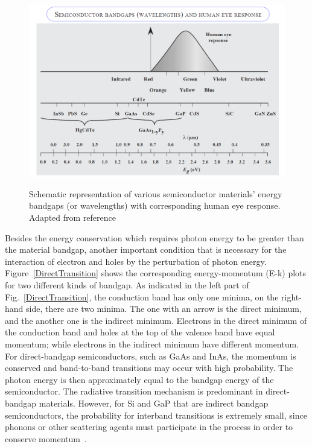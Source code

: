 \begin{figure}
  \caption[Schematic representation of various semiconductor materials' energy bandgaps (or wavelengths) with corresponding human eye response.]{Schematic representation of various semiconductor materials' energy bandgaps (or wavelengths) with corresponding human eye response. Adapted from reference~\cite{singh2007semiconductor}}
  \centering
  \includegraphics[width=\textwidth]{pictures/RM/BandgapEmission}
  \label{BandgapEmission}
\end{figure}

Besides the energy conservation which requires photon energy to be greater than
the material bandgap, another important condition that is necessary for the
interaction of electron and holes by the perturbation of photon energy.
Figure~\ref{DirectTransition} shows the corresponding energy-momentum (E-k)
plots for two different kinds of bandgap. As indicated in the left part of
Fig.~\ref{DirectTransition}, the conduction band has only one minima, on the
right-hand side, there are two minima. The one with an arrow is the direct
minimum, and the another one is the indirect minimum. Electrons in the direct
minimum of the conduction band and holes at the top of the valence band have
equal momentum; while electrons in the indirect minimum have different
momentum. For direct-bandgap semiconductors, such as GaAs and InAs, the
momentum is conserved and band-to-band transitions may occur with high
probability. The photon energy is then approximately equal to the bandgap
energy of the semiconductor. The radiative transition mechanism is predominant
in direct-bandgap materials. However, for Si and GaP that are indirect bandgap
semiconductors, the probability for interband transitions is extremely small,
since phonons or other scattering agents must participate in the process in
order to conserve momentum~\cite{sze2006physics}.

